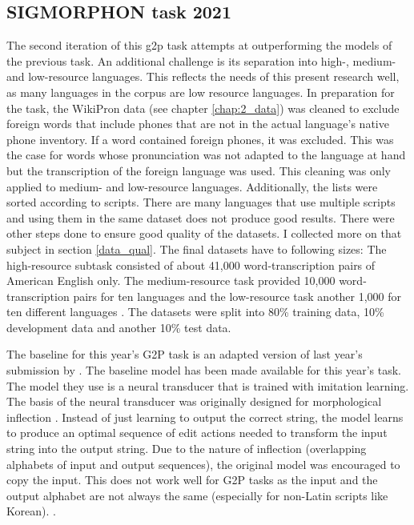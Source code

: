 \subsection{SIGMORPHON task 2021}
\label{sig21}
The second iteration of this \ac{g2p} task attempts at outperforming the models of the previous task. An additional challenge is its separation into high-, medium- and low-resource languages. This reflects the needs of this present research well, as many languages in the corpus are low resource languages. In preparation for the task, the WikiPron data (see chapter \ref{chap:2_data}) was cleaned to exclude foreign words that include phones that are not in the actual language's native phone inventory. If a word contained foreign phones, it was excluded. This was the case for words whose pronunciation was not adapted to the language at hand but the transcription of the foreign language was used. This cleaning was only applied to medium- and low-resource languages. Additionally, the lists were sorted according to scripts. There are many languages that use multiple scripts and using them in the same dataset does not produce good results. There were other steps done to ensure good quality of the datasets. I collected more on that subject in section \ref{data_qual}. 
The final datasets have to following sizes: The high-resource subtask consisted of about 41,000 word-transcription pairs of American English only. The medium-resource task provided 10,000 word-transcription pairs for ten languages and the low-resource task another 1,000 for ten different languages \citep{Ashby&Bartley.2021}. The datasets were split into 80\% training data, 10\% development data and another 10\% test data. 

The baseline for this year's G2P task is an adapted version of last year's submission by \citet{makarov-clematide-2020-cluzh}. The baseline model has been made available for this year's task. The model they use is a neural transducer that is trained with imitation learning. The basis of the neural transducer was originally designed for morphological inflection \citep{Aharoni&Goldberg.2016}. Instead of just learning to output the correct string, the model learns to produce an optimal sequence of edit actions needed to transform the input string into the output string. Due to the nature of inflection (overlapping alphabets of input and output sequences), the original model was encouraged to copy the input. This does not work well for G2P tasks as the input and the output alphabet are not always the same (especially for non-Latin scripts like Korean). .

